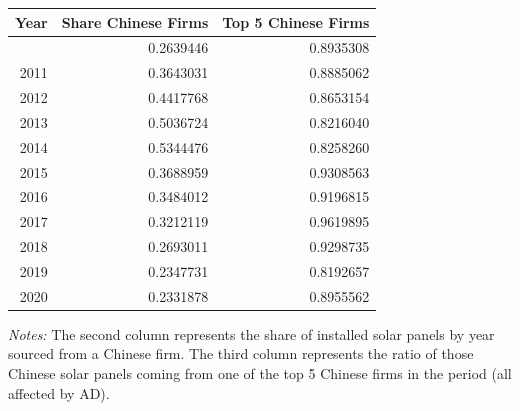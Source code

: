 \begin{table}[H]
\fontsize{12.0pt}{14.4pt}\selectfont
\begin{tabular*}{\linewidth}{@{\extracolsep{\fill}}rrr}
\toprule
Year & Share Chinese Firms & Top 5 Chinese Firms \\ 
\midrule\addlinespace[2.5pt]
2010 & 0.2639446 & 0.8935308 \\ 
2011 & 0.3643031 & 0.8885062 \\ 
2012 & 0.4417768 & 0.8653154 \\ 
2013 & 0.5036724 & 0.8216040 \\ 
2014 & 0.5344476 & 0.8258260 \\ 
2015 & 0.3688959 & 0.9308563 \\ 
2016 & 0.3484012 & 0.9196815 \\ 
2017 & 0.3212119 & 0.9619895 \\ 
2018 & 0.2693011 & 0.9298735 \\ 
2019 & 0.2347731 & 0.8192657 \\ 
2020 & 0.2331878 & 0.8955562 \\ 
\bottomrule
\end{tabular*}
\begin{minipage}{\linewidth}
\vspace{5pt}
\footnotesize
    \textit{Notes:} The second column represents the share of installed solar panels by year sourced from a Chinese firm. The third column represents the ratio of those Chinese solar panels coming from one of the top 5 Chinese firms in the period (all affected by AD). 
\end{minipage}
\end{table}

